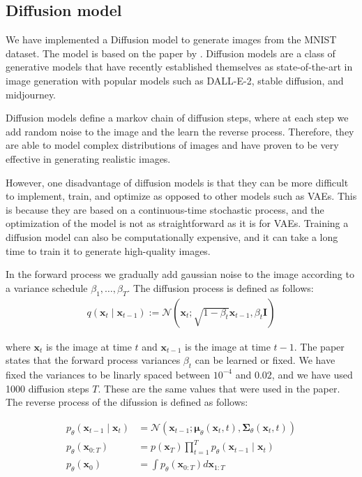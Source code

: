 \subsection*{Diffusion model}

We have implemented a Diffusion model to generate images from the MNIST dataset. The model is based on the paper by \cite{diffusion}. Diffusion models are a class of generative models that have recently established themselves as state-of-the-art in image generation with popular models such as DALL-E-2, stable diffusion, and midjourney.

Diffusion models define a markov chain of diffusion steps, where at each step we add random noise to the image and the learn the reverse process. Therefore, they are able to model complex distributions of images and have proven to be very effective in generating realistic images.

However, one disadvantage of diffusion models is that they can be more difficult to implement, train, and optimize as opposed to other models such as VAEs. This is because they are based on a continuous-time stochastic process, and the optimization of the model is not as straightforward as it is for VAEs. Training a diffusion model can also be computationally expensive, and it can take a long time to train it to generate high-quality images.

In the forward process we gradually add gaussian noise to the image according to a variance schedule $\beta_1, \hdots, \beta_T$. The diffusion process is defined as follows:
\begin{align*}
    q\left(\mathbf{x}_t \mid \mathbf{x}_{t-1}\right):=\mathcal{N}\left(\mathbf{x}_t ; \sqrt{1-\beta_t} \mathbf{x}_{t-1}, \beta_t \mathbf{I}\right)
\end{align*}

where $\mathbf{x}_t$ is the image at time $t$ and $\mathbf{x}_{t-1}$ is the image at time $t-1$. The paper \cite{diffusion} states that the forward process variances $\beta_t$ can be learned or fixed. We have fixed the variances to be linarly spaced between $10^{-4}$ and $0.02$, and we have used 1000 diffusion steps $T$. These are the same values that were used in the paper. The reverse process of the difussion is defined as follows:

\begin{align*}
    p_\theta\left(\mathbf{x}_{t-1} \mid \mathbf{x}_t\right)&=\mathcal{N}\left(\mathbf{x}_{t-1} ; \boldsymbol{\mu}_\theta\left(\mathbf{x}_t, t\right), \boldsymbol{\Sigma}_\theta\left(\mathbf{x}_t, t\right)\right)\\
    p_\theta\left(\mathbf{x}_{0: T}\right)&=p\left(\mathbf{x}_T\right) \prod_{t=1}^T p_\theta\left(\mathbf{x}_{t-1} \mid \mathbf{x}_t\right)\\
    p_\theta\left(\mathbf{x}_0\right) &=\int p_\theta\left(\mathbf{x}_{0: T}\right) d \mathbf{x}_{1: T}
\end{align*}

